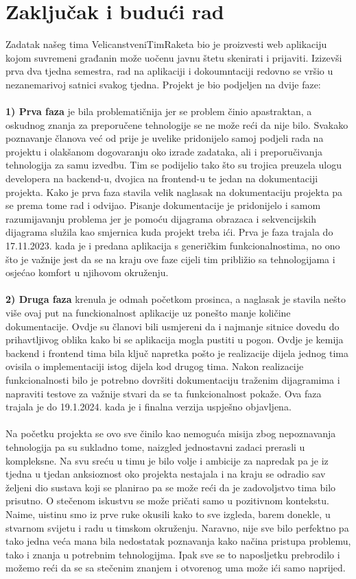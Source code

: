 \chapter{Zaključak i budući rad}
		
		Zadatak našeg tima VelicanstveniTimRaketa bio je proizvesti web aplikaciju kojom suvremeni građanin može uočenu javnu štetu skenirati i prijaviti. Izizevši prva dva tjedna semestra, rad na aplikaciji i dokoumntaciji redovno se vršio u nezanemarivoj satnici svakog tjedna. Projekt je bio podjeljen na dvije faze: \\
		\\
		\indent \textbf{1) Prva faza} je bila problematičnija jer se problem činio apastraktan, a oskudnog znanja za preporučene tehnologije se ne može reći da nije bilo. Svakako poznavanje članova već od prije je uvelike pridonijelo samoj podjeli rada na projektu i olakšanom dogovaranju oko izrade zadataka, ali i preporučivanja tehnologija za samu izvedbu. Tim se podijelio tako što su trojica preuzela ulogu developera na backend-u, dvojica na frontend-u te jedan na dokumentaciji projekta. Kako je prva faza stavila velik naglasak na dokumentaciju projekta pa se prema tome rad i odvijao. Pisanje dokumentacije je pridonijelo i samom razumijavanju problema jer je pomoću dijagrama obrazaca i sekvencijskih dijagrama služila kao smjernica kuda projekt treba ići. Prva je faza trajala do 17.11.2023. kada je i predana aplikacija s generičkim funkcionalnostima, no ono što je važnije jest da se na kraju ove faze cijeli tim približio sa tehnologijama i osjećao komfort u njihovom okruženju.\\
		\\
		\indent \textbf{2) Druga faza} krenula je odmah početkom prosinca, a naglasak je stavila nešto više ovaj put na funckionalnost aplikacije uz ponešto manje količine dokumentacije. Ovdje su članovi bili usmjereni da i najmanje sitnice dovedu do prihavtljivog oblika kako bi se aplikacija mogla pustiti u pogon.  Ovdje je kemija backend i frontend tima bila ključ napretka pošto je realizacije dijela jednog tima ovisila o implementaciji istog dijela kod drugog tima. Nakon realizacije funkcionalnosti bilo je potrebno dovršiti dokumentaciju traženim dijagramima i napraviti testove za važnije stvari da se ta funkcionalnost pokaže. Ova faza trajala je do 19.1.2024. kada je i finalna verzija uspješno objavljena.\\
		\\
		Na početku projekta se ovo sve činilo kao nemoguća misija zbog nepoznavanja tehnologija pa su sukladno tome, naizgled jednostavni zadaci prerasli u kompleksne. Na svu sreću u timu je bilo volje i ambicije za napredak pa je iz tjedna u tjedan anksioznost oko projekta nestajala i na kraju se odradio sav željeni dio sustava koji se planirao pa se može reći da je zadovoljstvo tima bilo prisutno. O stečenom iskustvu se može pričati samo u pozitivnom kontekstu. Naime, uistinu smo iz prve ruke okusili kako to sve izgleda, barem donekle, u stvarnom svijetu i radu u timskom okruženju. Naravno, nije sve bilo perfektno pa tako jedna veća mana bila nedostatak poznavanja kako načina pristupa problemu, tako i znanja u potrebnim tehnologijma. Ipak sve se to naposljetku prebrodilo i možemo reći da se sa stečenim znanjem i otvorenog uma može ići samo naprijed.
		\eject 